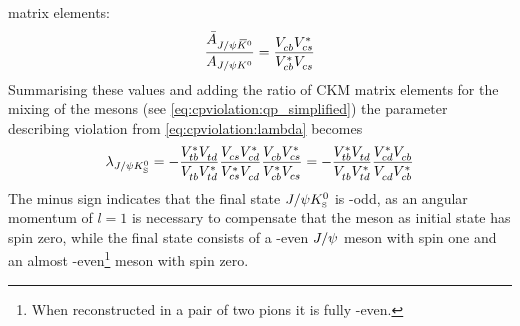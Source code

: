 matrix elements:
\begin{align}
	\frac{\bar{A}_{J/\psi{\ensuremath{{\kern 0.2em\overline{\kern -0.2em K}{}}{}^0}}}}{A_{J/\psi{\ensuremath{{K}^0}}}} = \frac{{V_{{c}{b}}^{}}{V_{{c}{s}}^\ast}}{{V_{{c}{b}}^\ast}{V_{{c}{s}}^{}}}
\end{align}
Summarising these values and adding the ratio of CKM matrix elements for the
mixing of the \Bd mesons (see \cref{eq:cpviolation:qp_simplified}) the
parameter describing \CP violation from \cref{eq:cpviolation:lambda} becomes
\begin{align}
	\lambda_{J/\psi{\ensuremath{{K}^0_{\mathrm{ \scriptscriptstyle S}}}}} = - \frac{{V_{{t}{b}}^\ast}{V_{{t}{d}}^{}}}{{V_{{t}{b}}^{}}{V_{{t}{d}}^\ast}}\frac{{V_{{c}{s}}^{}}{V_{{c}{d}}^\ast}}{{V_{{c}{s}}^\ast}{V_{{c}{d}}^{}}}\frac{{V_{{c}{b}}^{}}{V_{{c}{s}}^\ast}}{{V_{{c}{b}}^\ast}{V_{{c}{s}}^{}}} = - \frac{{V_{{t}{b}}^\ast}{V_{{t}{d}}^{}}}{{V_{{t}{b}}^{}}{V_{{t}{d}}^\ast}}\frac{{V_{{c}{d}}^\ast}{V_{{c}{b}}^{}}}{{V_{{c}{d}}^{}}{V_{{c}{b}}^\ast}}
\end{align}
The minus sign indicates that the final state $J/\psi{\ensuremath{{K}^0_{\mathrm{ \scriptscriptstyle S}}}}$ is \CP-odd, as an
angular momentum of $l = 1$ is necessary to compensate that the \Bd meson as
initial state has spin zero, while the final state consists of a \CP-even
$J/\psi$ meson with spin one and an almost \CP-even\footnote{When reconstructed
in a pair of two pions it is fully \CP-even.} \KS meson with spin zero.